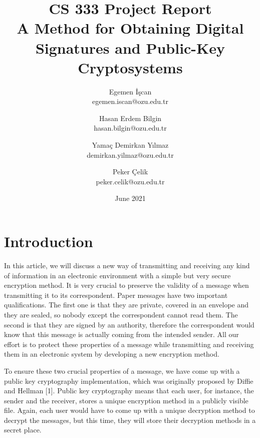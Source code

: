 \documentclass[12pt, letterpaper]{article}
\begin{document}
\title{\huge\textbf{CS 333 Project Report \\
\small A Method for Obtaining Digital Signatures and Public-Key Cryptosystems}}
\author{
Egemen İşcan\\
egemen.iscan@ozu.edu.tr
\and
Hasan Erdem Bilgin\\
hasan.bilgin@ozu.edu.tr
\and
Yamaç Demirkan Yılmaz\\
demirkan.yilmaz@ozu.edu.tr
\and
Peker Çelik\\
peker.celik@ozu.edu.tr
}
\date{June 2021}

\renewcommand\thesection{\Roman{section}.}
\renewcommand{\thesubsection}{\Alph{subsection}.}
\setlength{\parindent}{4em}
\setlength{\parskip}{1em}

\maketitle
\newpage

\begin{spacing}{0.01}
  \tableofcontents
\end{spacing}

\newpage

\section{Introduction}

In this article, we will discuss a new way of transmitting and receiving any kind of information in an electronic environment with a simple but very secure encryption method. It is very crucial to preserve the validity of a message when transmitting it to its correspondent. Paper messages have two important qualifications. The first one is that they are private, covered in an envelope and they are sealed, so nobody except the correspondent cannot read them. The second is that they are signed by an authority, therefore the correspondent would know that this message is actually coming from the intended sender. All our effort is to protect these properties of a message while transmitting and receiving them in an electronic system by developing a new encryption method.

To ensure these two crucial properties of a message, we have come up with a public key cryptography implementation, which was originally proposed by Diffie and Hellman [1]. Public key cryptography means that each user, for instance, the sender and the receiver, stores a unique encryption method in a publicly visible file. Again, each user would have to come up with a unique decryption method to decrypt the messages, but this time, they will store their decryption methods in a secret place.
\end{document}
